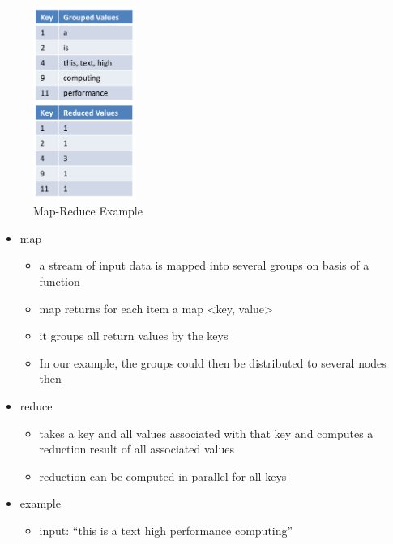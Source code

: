 \begin{figure}[H]
\centering
\includegraphics[width=0.3\textwidth]{figures/maprecudeExample.png}
\caption{Map-Reduce Example}
\end{figure}

\begin{itemize}
\tightlist
\item
  map

  \begin{itemize}
  \tightlist
  \item
    a stream of input data is mapped into several groups on basis of a
    function
  \item
    map returns for each item a map \textless{}key, value\textgreater{}
  \item
    it groups all return values by the keys
  \item
    In our example, the groups could then be distributed to several
    nodes then
  \end{itemize}
\item
  reduce

  \begin{itemize}
  \tightlist
  \item
    takes a key and all values associated with that key and computes a
    reduction result of all associated values
  \item
    reduction can be computed in parallel for all keys
  \end{itemize}
\item
  example

  \begin{itemize}
  \tightlist
  \item
    input: ``this is a text high performance computing''
  \end{itemize}
\end{itemize}

